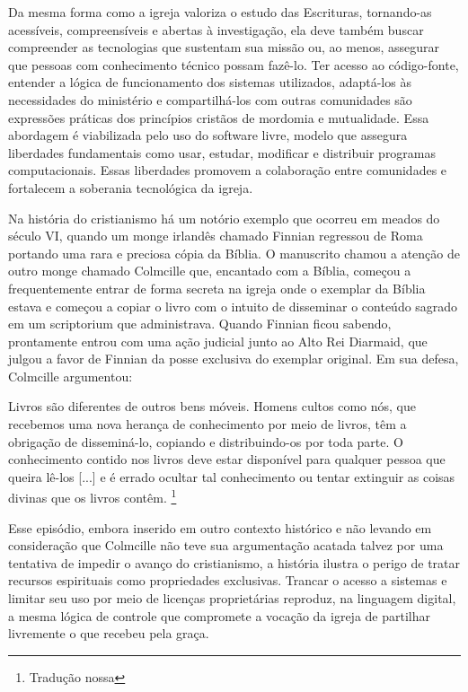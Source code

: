Da mesma forma como a igreja valoriza o estudo das Escrituras, tornando-as acessíveis, compreensíveis e abertas à investigação, ela deve também buscar compreender as tecnologias que sustentam sua missão ou, ao menos, assegurar que pessoas com conhecimento técnico possam fazê-lo. Ter acesso ao código-fonte, entender a lógica de funcionamento dos sistemas utilizados, adaptá-los às necessidades do ministério e compartilhá-los com outras comunidades são expressões práticas dos princípios cristãos de mordomia e mutualidade. Essa abordagem é viabilizada pelo uso do software livre, modelo que assegura liberdades fundamentais como usar, estudar, modificar e distribuir programas computacionais. Essas liberdades promovem a colaboração entre comunidades e fortalecem a soberania tecnológica da igreja.

Na história do cristianismo há um notório exemplo que ocorreu em meados do século VI, quando um monge irlandês chamado Finnian regressou de Roma portando uma rara e preciosa cópia da Bíblia. O manuscrito chamou a atenção de outro monge chamado Colmcille que, encantado com a Bíblia, começou a frequentemente entrar de forma secreta na igreja onde o exemplar da Bíblia estava e começou a copiar o livro com o intuito de disseminar o conteúdo sagrado em um \foreignlanguage{latin}{scriptorium} que administrava. Quando Finnian ficou sabendo, prontamente entrou com uma ação judicial junto ao Alto Rei Diarmaid, que julgou a favor de Finnian da posse exclusiva do exemplar original. Em sua defesa, Colmcille argumentou:

\begin{citacao}
    Livros são diferentes de outros bens móveis. Homens cultos como nós, que recebemos uma nova herança de conhecimento por meio de livros, têm a obrigação de disseminá-lo, copiando e distribuindo-os por toda parte. O conhecimento contido nos livros deve estar disponível para qualquer pessoa que queira lê-los [...] e é errado ocultar tal conhecimento ou tentar extinguir as coisas divinas que os livros contêm. \cite[p.~40-42]{owens_dorean_2021}\footnote{Tradução nossa}
\end{citacao}

Esse episódio, embora inserido em outro contexto histórico e não levando em consideração que Colmcille não teve sua argumentação acatada talvez por uma tentativa de impedir o avanço do cristianismo, a história ilustra o perigo de tratar recursos espirituais como propriedades exclusivas. Trancar o acesso a sistemas e limitar seu uso por meio de licenças proprietárias reproduz, na linguagem digital, a mesma lógica de controle que compromete a vocação da igreja de partilhar livremente o que recebeu pela graça.

